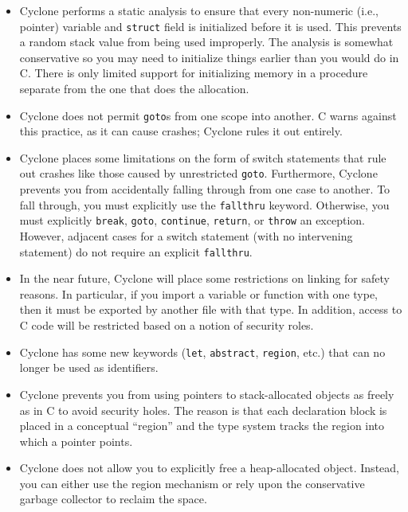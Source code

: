 \begin{itemize}
\item Cyclone performs a static analysis to ensure that every
  non-numeric (i.e., pointer) variable
  and \texttt{struct} field is initialized before it is used. This
  prevents a random stack value from being used improperly. The
  analysis is somewhat conservative so you may need to initialize
  things earlier than you would do in C\@.  There is only limited
  support for initializing memory in a procedure separate from the one
  that does the allocation.

\item Cyclone does not permit \texttt{goto}s from one scope into
  another. C warns against this practice, as it can cause crashes;
  Cyclone rules it out entirely.

\item Cyclone places some limitations on the form of switch statements
  that rule out crashes like those caused by unrestricted
  \texttt{goto}.  Furthermore, Cyclone prevents you from accidentally
  falling through from one case to another. To fall through, you must
  explicitly use the \texttt{fallthru} keyword.  Otherwise, you must
  explicitly \texttt{break}, \texttt{goto}, \texttt{continue},
  \texttt{return}, or \texttt{throw} an exception.  However, adjacent
  cases for a switch statement (with no intervening statement) do
  not require an explicit \texttt{fallthru}.

\item In the near future, Cyclone will place some restrictions on
  linking for safety reasons. In particular, if you import a variable
  or function with one type, then it must be exported by another file
  with that type. In addition, access to C code will be restricted
  based on a notion of security roles.

\item Cyclone has some new keywords (\texttt{let}, \texttt{abstract},
  \texttt{region}, etc.) that can no longer be used as identifiers.

\item Cyclone prevents you from using pointers to stack-allocated
  objects as freely as in C to avoid security holes. The reason is
  that each declaration block is placed in a conceptual ``region'' and
  the type system tracks the region into which a pointer points.

\item Cyclone does not allow you to explicitly free a heap-allocated
  object. Instead, you can either use the region mechanism or rely
  upon the conservative garbage collector to reclaim the space.

\end{itemize}

